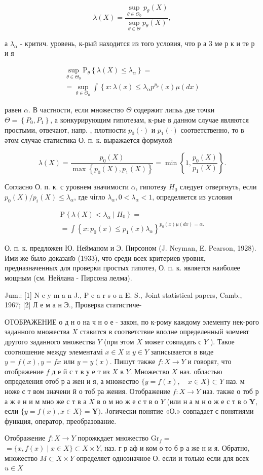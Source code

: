 \documentclass[10pt]{article}
\begin{document}
\[
\lambda(X)=\frac{\sup _{\theta \in \Theta_{0}} p_{\theta}(X)}{\sup _{\theta \in \Theta} p_{\theta}(X)},
\]

а $\lambda_{\alpha}$ - критич. уровень, к-рый находится из того условия, что р а 3 ме р к и те р и я

\[
\begin{gathered}
\sup _{\theta \in \Theta_{0}} \mathrm{P}_{\theta}\left\{\lambda(X) \leqslant \lambda_{\alpha}\right\}= \\
=\sup _{\theta \in \Theta_{0}} \int\left\{x: \lambda(x) \leqslant \lambda_{\alpha} p^{p_{\theta}}(x) \mu(d x)\right.
\end{gathered}
\]

равен $\alpha$. В частности, если множество $\Theta$ содержит липьь две точки $\Theta=\left\{P_{0}, P_{1}\right\}$, а конкурирующим гипотезам, к-рые в данном случае являются простыми, отвечают, напр. , плотности $p_{0}(\cdot)$ и $p_{1}(\cdot)$ соответственно, то в әтом случае статистика О. п. к. выражается формулой

\[
\lambda(X)=\frac{p_{0}(X)}{\max \left\{p_{0}(X), p_{1}(X)\right\}}=\min \left\{1, \frac{p_{0}(X)}{p_{1}(X)}\right\} .
\]

Согласно О. п. к. с уровнем значимости $\alpha$, гипотезу $H_{0}$ следует отвергнуть, если $p_{0}(X) / p_{i}(X) \leqslant \lambda_{\alpha}$, где чігло $\lambda_{\alpha}, 0<\lambda_{\alpha}<1$, определяется из условия

\[
\begin{gathered}
\mathrm{P}\left\{\lambda(X)<\lambda_{\alpha} \mid H_{0}\right\}= \\
=\int\left\{x: p_{0}(x) \leqslant p_{1}(x) \lambda_{\alpha}\right\}^{p_{0}(x) \mu(d x)=\alpha .}
\end{gathered}
\]

О. п. к. предложен Ю. Нейманом и Э. Пирсоном (J. Neyman, E. Pearson, 1928). Ими же было доказан̆о (1933), что среди всех критериев уровня, предназначенных для проверки простых гипотез, О. п. к. является наиболее мощным (см. Нейлана - Пирсона лелма).

Jum.: [1] N e y m a n J., P e a r s o n E. S., Joint statistical papers, Camb., 1967; [2] Л е м а н Э., Проверка статистиче-

ОТОБРАЖЕНИЕ о д н о на ч н о е - закон, по к-рому каждому элементу нек-рого заданного множества $X$ ставится в соответствие вполне определенный элемевт другого заданного множества $Y$ (при этом $X$ может совпадать с $Y$ ). Такое соотношение между элементамі $x \in X$ и $y \in Y$ записывается в виде $y=f(x), y=f x$ или $y=y(x)$. Пишут также $f: X \rightarrow Y$ и говорят, что отображение $f$ д е й с т в у е т из $X$ в $Y$. Множество $X$ наз. областью определения отоб р а жен и я, а множество $\{y=f(x), \quad x \in X\} \subset Y$ наз. м ноже с т вом значени й о тоб ра жения. Отображение $f: X \rightarrow Y$ наз. также о тоб р а ж е н и м мно же с т в а $X$ в о м но ж е с т в о $Y$ (или н а м н о ж е с т в о $\boldsymbol{Y}$, если $\{y=f(x), x \in X\}=\boldsymbol{Y})$. Jогически понятие «О.» совпадает с понятиями функция, оператор, преобразование.

Отображение $f: X \rightarrow Y$ порожкдает множество $\mathrm{Gr}_{f}=$ $=\{x, f(x) \mid x \in X\} \subset X \times Y$, наз. г р аф и ком о то б р а же н и я. Обратно, множество $M \subset X \times Y$ определяет однозначное $О$. если и только если для всех $u \in X$
\end{document}
